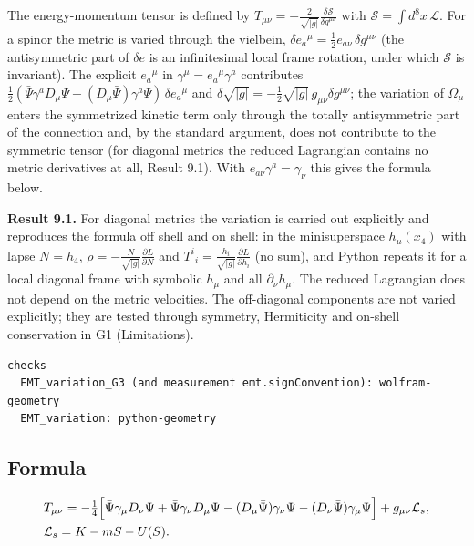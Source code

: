 \documentclass[11pt]{article}
\begin{document}
The energy-momentum tensor is defined by $T_{\mu\nu}=-\frac{2}{\sqrt{|g|}}\frac{\delta\mathcal S}{\delta g^{\mu\nu}}$ with $\mathcal S=\int d^8x\,\mathcal L$. For a spinor the metric is varied through the vielbein, $\delta e_a{}^\mu=\tfrac12e_{a\nu}\,\delta g^{\mu\nu}$ (the antisymmetric part of $\delta e$ is an infinitesimal local frame rotation, under which $\mathcal S$ is invariant). The explicit $e_a{}^\mu$ in $\gamma^\mu=e_a{}^\mu\gamma^a$ contributes $\tfrac12(\bar\Psi\gamma^aD_\mu\Psi-(D_\mu\bar\Psi)\gamma^a\Psi)\,\delta e_a{}^\mu$ and $\delta\sqrt{|g|}=-\tfrac12\sqrt{|g|}\,g_{\mu\nu}\delta g^{\mu\nu}$; the variation of $\Omega_\mu$ enters the symmetrized kinetic term only through the totally antisymmetric part of the connection and, by the standard argument, does not contribute to the symmetric tensor (for diagonal metrics the reduced Lagrangian contains no metric derivatives at all, Result 9.1). With $e_{a\nu}\gamma^a=\gamma_\nu$ this gives the formula below.

\textbf{Result 9.1.} For diagonal metrics the variation is carried out explicitly and reproduces the formula off shell and on shell: in the minisuperspace $h_\mu(x_4)$ with lapse $N=h_4$, $\rho=-\frac{N}{\sqrt{|g|}}\frac{\partial L}{\partial N}$ and $T^i{}_i=\frac{h_i}{\sqrt{|g|}}\frac{\partial L}{\partial h_i}$ (no sum), and Python repeats it for a local diagonal frame with symbolic $h_\mu$ and all $\partial_\nu h_\mu$. The reduced Lagrangian does not depend on the metric velocities. The off-diagonal components are not varied explicitly; they are tested through symmetry, Hermiticity and on-shell conservation in G1 (Limitations).

\begin{Verbatim}[fontsize=\small]
checks
  EMT_variation_G3 (and measurement emt.signConvention): wolfram-geometry
  EMT_variation: python-geometry
\end{Verbatim}

\subsection{Formula}

\[
\begin{aligned}
&T_{\mu\nu}=-\tfrac14\Bigl[\bar\Psi\gamma_\mu D_\nu\Psi+\bar\Psi\gamma_\nu D_\mu\Psi-(D_\mu\bar\Psi)\gamma_\nu\Psi-(D_\nu\bar\Psi)\gamma_\mu\Psi\Bigr]+g_{\mu\nu}\mathcal L_s,\\
&\mathcal L_s=K-mS-U(S).
\end{aligned}
\]
\end{document}
